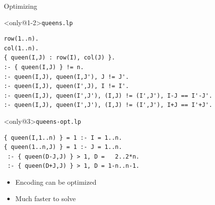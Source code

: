 \begin{frame}[fragile]{Optimizing}
  \bigskip
  \begin{block}<only@1-2>{\texttt{queens.lp}}
\begin{lstlisting}[basicstyle=\footnotesize\ttfamily]
row(1..n).
col(1..n).
{ queen(I,J) : row(I), col(J) }.
:- { queen(I,J) } != n.
:- queen(I,J), queen(I,J'), J != J'.
:- queen(I,J), queen(I',J), I != I'.
:- queen(I,J), queen(I',J'), (I,J) != (I',J'), I-J == I'-J'.
:- queen(I,J), queen(I',J'), (I,J) != (I',J'), I+J == I'+J'.
\end{lstlisting}
  \end{block}
  \begin{block}<only@3>{\texttt{queens-opt.lp}}
\begin{lstlisting}
{ queen(I,1..n) } = 1 :- I = 1..n.
{ queen(1..n,J) } = 1 :- J = 1..n.
 :- { queen(D-J,J) } > 1, D =   2..2*n.
 :- { queen(D+J,J) } > 1, D = 1-n..n-1.
\end{lstlisting}
  \end{block}
  \vfill
  \begin{itemize}
  \item<2-3> Encoding can be optimized
  \item<2-3> Much faster to solve
  \end{itemize}
  \bigskip
\end{frame}
